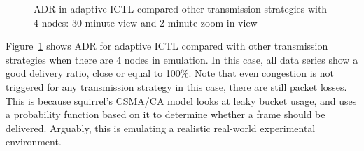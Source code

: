 \documentclass[12pt]{report}
\begin{document}
\begin{figure}[H]
  \caption{\label{fig:adaptive_adr_4}ADR in adaptive ICTL compared other transmission strategies with 4 nodes: 30-minute view and 2-minute zoom-in view}
\end{figure}

Figure~\ref{fig:adaptive_adr_4} shows ADR for adaptive ICTL compared with other transmission strategies when there are 4 nodes in emulation. In this case, all data series show a good delivery ratio, close or equal to 100\%. Note that even congestion is not triggered for any transmission strategy in this case, there are still packet losses. This is because squirrel's CSMA/CA model looks at leaky bucket usage, and uses a probability function based on it to determine whether a frame should be delivered. Arguably, this is emulating a realistic real-world experimental environment.
\end{document}
